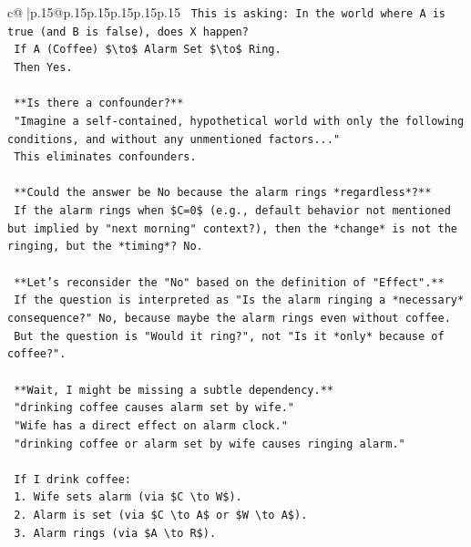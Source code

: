 \documentclass{article}
\begin{document}
{\begin{supertabular}{c@{$\;$}|p{.15\linewidth}@{}p{.15\linewidth}p{.15\linewidth}p{.15\linewidth}p{.15\linewidth}p{.15\linewidth}}
{{{\texttt{        This is asking: In the world where A is true (and B is false), does X happen?} \\
\texttt{        If A (Coffee) \$\textbackslash{}to\$ Alarm Set \$\textbackslash{}to\$ Ring.} \\
\texttt{        Then Yes.} \\
\\ 
\texttt{        **Is there a confounder?**} \\
\texttt{        "Imagine a self{-}contained, hypothetical world with only the following conditions, and without any unmentioned factors..."} \\
\texttt{        This eliminates confounders.} \\
\\ 
\texttt{        **Could the answer be No because the alarm rings *regardless*?**} \\
\texttt{        If the alarm rings when \$C=0\$ (e.g., default behavior not mentioned but implied by "next morning" context?), then the *change* is not the ringing, but the *timing*? No.} \\
\\ 
\texttt{        **Let's reconsider the "No" based on the definition of "Effect".**} \\
\texttt{        If the question is interpreted as "Is the alarm ringing a *necessary* consequence?" No, because maybe the alarm rings even without coffee.} \\
\texttt{        But the question is "Would it ring?", not "Is it *only* because of coffee?".} \\
\\ 
\texttt{        **Wait, I might be missing a subtle dependency.**} \\
\texttt{        "drinking coffee causes alarm set by wife."} \\
\texttt{        "Wife has a direct effect on alarm clock."} \\
\texttt{        "drinking coffee or alarm set by wife causes ringing alarm."} \\
\\ 
\texttt{        If I drink coffee:} \\
\texttt{        1. Wife sets alarm (via \$C \textbackslash{}to W\$).} \\
\texttt{        2. Alarm is set (via \$C \textbackslash{}to A\$ or \$W \textbackslash{}to A\$).} \\
\texttt{        3. Alarm rings (via \$A \textbackslash{}to R\$).} \\
}}}
\end{supertabular}}
\end{document}
